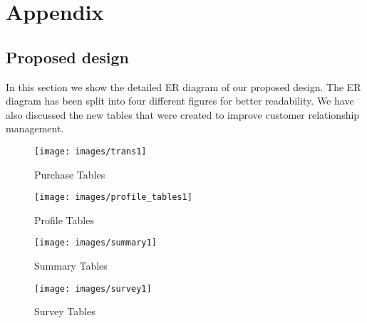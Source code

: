 \appendix
\chapter{Appendix}
\section{Proposed design}
In this section we show the detailed ER diagram of our proposed design. The ER diagram has been split into four different figures for better readability. We have also discussed the new tables that were created to improve customer relationship management.
\begin{figure}
\centering
\texttt{[image: images/trans1]}
\caption{Purchase Tables}
\label{Pdesign1}
\end{figure}
\begin{figure}
\centering
\texttt{[image: images/profile\_tables1]}
\caption{Profile Tables}
\label{Pdesign2}
\end{figure}
\begin{figure}
\centering
\texttt{[image: images/summary1]}
\caption{Summary Tables}
\label{Pdesign3}
\end{figure}
\begin{figure}
\centering
\texttt{[image: images/survey1]}
\caption{Survey Tables}
\label{Pdesign4}
\end{figure}
